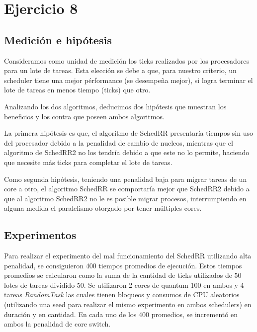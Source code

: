 \documentclass[a4paper,10pt,twoside]{article}
\begin{document}


\section{Ejercicio 8}

\subsection{Medición e hipótesis}
Consideramos como unidad de medición los ticks realizados por los procesadores para un lote de tareas. Esta elección se debe a que, para nuestro criterio, un scheduler tiene una mejor pérformance (se desempeña mejor), si logra terminar el lote de tareas en menos tiempo (ticks) que otro.

Analizando los dos algoritmos, deducimos dos hipótesis que muestran los beneficios y los contra que poseen ambos algoritmos.

La primera hipótesis es que, el algoritmo de SchedRR presentaría tiempos sin uso del procesador debido a la penalidad de cambio de nucleos, mientras que el algoritmo de SchedRR2 no los tendría debido a que este no lo permite, haciendo que necesite más ticks para completar el lote de tareas.

Como segunda hipótesis, teniendo una penalidad baja para migrar tareas de un core a otro,  el algoritmo SchedRR se comportaría mejor que SchedRR2 debido a que al algoritmo SchedRR2 no le es posible migrar procesos, interrumpiendo en alguna medida el paralelismo otorgado por tener múltiples cores.

\subsection{Experimentos}

Para realizar el experimento del mal funcionamiento del SchedRR utilizando alta penalidad, se consiguieron 400 tiempos promedios de ejecución. Estos tiempos promedios se calcularon como la suma de la cantidad de ticks utilizados de 50 lotes de tareas dividido 50. Se utilizaron 2 cores de quantum 100 en ambos y 4 tareas \textit{RandomTask} las cuales tienen bloqueos y consumos de CPU aleatorios (utilizando una seed para realizar el mismo experimento en ambos schedulers) en duración y en cantidad. En cada uno de los 400 promedios, se incrementó en ambos la penalidad de core switch.
\end{document}
